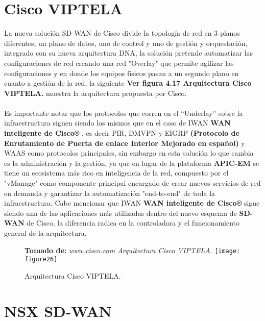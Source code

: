 \section{Cisco VIPTELA}
\label{sec:Cisco VIPTELA}
La nueva solución SD-WAN de Cisco divide la topología de red en 3 planos diferentes, un plano de datos, uno de control y uno de gestión y orquestación, integrado con su nueva arquitectura DNA, la solución pretende automatizar las configuraciones de red creando una red "Overlay" que permite agilizar las configuraciones y en donde los equipos físicos pasan a un segundo plano en cuanto a gestión de la red, la siguiente
\textbf{Ver figura 4.17 Arquitectura Cisco VIPTELA.}  muestra la arquitectura propuesta por Cisco. 
\\
\\
Es importante notar que los protocolos que corren en el “Underlay” sobre la infraestructura siguen siendo
los mismos que en el caso de IWAN \textbf{WAN inteligente de Cisco®} , es decir PfR, DMVPN y EIGRP \textbf{(Protocolo de Enrutamiento de Puerta de enlace Interior Mejorado en español)} y WAAS como protocolos principales, sin embargo en esta solución lo que cambia es la administración y la gestión, ya que en lugar de la plataforma \textbf{APIC-EM} se tiene un ecosistema más rico en inteligencia de la red, compuesto por el "vManage" como componente principal
encargado de crear nuevos servicios de red en demanda y garantizar la automatización "end-to-end" de toda la infraestructura. Cabe mencionar que IWAN \textbf{WAN inteligente de Cisco®}  sigue siendo una de las aplicaciones más utilizadas dentro del nuevo esquema de \textbf{SD-WAN} de Cisco, la diferencia radica en la controladora y el funcionamiento general de la arquitectura.

\begin{figure}[htbp]
 \textbf{Tomado de:} \textit{www.cisco.com Arquitectura Cisco VIPTELA}.
  \centering
    {\texttt{[image: figure26]}}
  \caption{Arquitectura Cisco VIPTELA.}
  \label{fig:fig2subfig}
\end{figure}

\section{NSX SD-WAN}
\label{sec:NSX SD-WAN}


